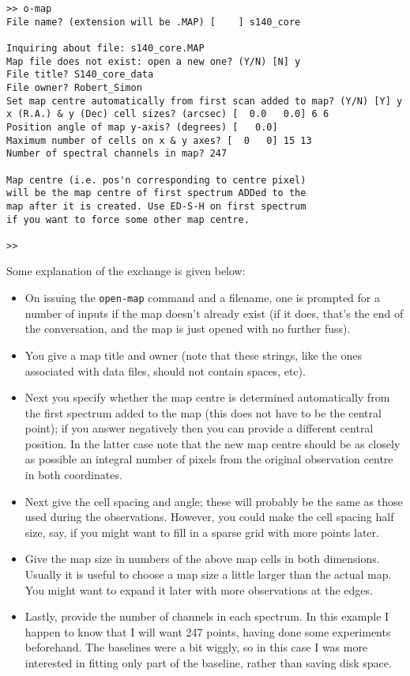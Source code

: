 \begin{verbatim}
>> o-map
File name? (extension will be .MAP) [    ] s140_core

Inquiring about file: s140_core.MAP
Map file does not exist: open a new one? (Y/N) [N] y
File title? S140_core_data
File owner? Robert_Simon
Set map centre automatically from first scan added to map? (Y/N) [Y] y
x (R.A.) & y (Dec) cell sizes? (arcsec) [  0.0   0.0] 6 6
Position angle of map y-axis? (degrees) [   0.0]
Maximum number of cells on x & y axes? [  0   0] 15 13
Number of spectral channels in map? 247

Map centre (i.e. pos'n corresponding to centre pixel)
will be the map centre of first spectrum ADDed to the
map after it is created. Use ED-S-H on first spectrum
if you want to force some other map centre.

>>
\end{verbatim}

Some explanation of the exchange is given below:
\begin{itemize}
\item
On issuing the {\tt open-map} command and a filename, one is prompted
for a number of inputs if the map doesn't already exist (if it does,
that's the end of the conversation, and the map is just opened with no
further fuss).
\item
You give a map title and owner (note that these strings, like the ones
associated with data files, should not contain spaces, etc).
\item
Next you specify whether the map centre is determined automatically
from the first spectrum added to the map (this does not have to be the
central point); if you answer negatively then you can provide a
different central position. In the latter case note that the new map
centre should be as closely as possible an integral number of pixels
from the original observation centre in both coordinates.
\item
Next give the cell spacing and angle; these will probably be the same
as those used during the observations. However, you could make the
cell spacing half size, say, if you might want to fill in a sparse
grid with more points later.
\item
Give the map size in numbers of the above map cells in both
dimensions. Usually it is useful to choose a map size a little larger
than the actual map. You might want to expand it later with more
observations at the edges.
\item
Lastly, provide the number of channels in each spectrum. In this
example I happen to know that I will want 247 points, having done
some experiments beforehand. The baselines were a bit wiggly, so in
this case I was more interested in fitting only part of the baseline,
rather than saving disk space.
\end{itemize}

